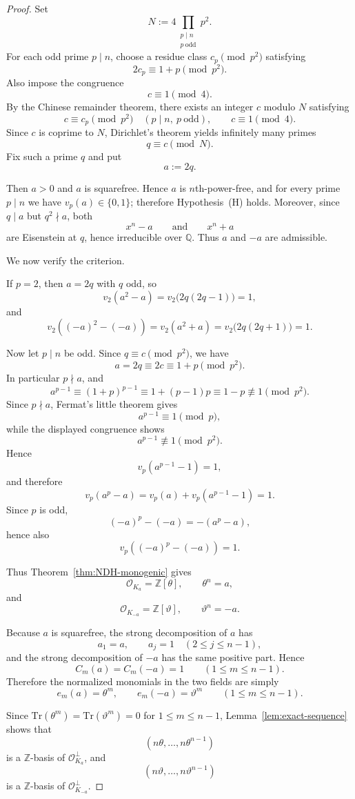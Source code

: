 \documentclass[10pt,a4paper]{amsart}
\newcommand{\Q}{\mathbb{Q}}
\newcommand{\Tr}{\mathrm{Tr}}
\newcommand{\Z}{\mathbb{Z}}
\newcommand{\cO}{\mathcal{O}}
\begin{document}
\begin{proof}
Set
\[
N:=4\prod_{\substack{p\mid n\\ p\ \mathrm{odd}}} p^2.
\]
For each odd prime \(p\mid n\), choose a residue class \(c_p\pmod{p^2}\) satisfying
\[
2c_p\equiv 1+p \pmod{p^2}.
\]
Also impose the congruence
\[
c\equiv 1 \pmod 4.
\]
By the Chinese remainder theorem, there exists an integer \(c\) modulo \(N\) satisfying
\[
c\equiv c_p \pmod{p^2}\quad (p\mid n,\ p\ \mathrm{odd}),
\qquad
c\equiv 1\pmod 4.
\]
Since \(c\) is coprime to \(N\), Dirichlet's theorem yields infinitely many primes
\[
q\equiv c \pmod N.
\]
Fix such a prime \(q\) and put
\[
a:=2q.
\]

Then \(a>0\) and \(a\) is squarefree. Hence \(a\) is \(n\)th-power-free, and for every prime
\(p\mid n\) we have \(v_p(a)\in\{0,1\}\); therefore Hypothesis~\textup{(H)} holds.
Moreover, since \(q\mid a\) but \(q^2\nmid a\), both
\[
x^n-a\qquad\text{and}\qquad x^n+a
\]
are Eisenstein at \(q\), hence irreducible over \(\Q\). Thus \(a\) and \(-a\) are admissible.

We now verify the criterion.

If \(p=2\), then \(a=2q\) with \(q\) odd, so
\[
v_2(a^2-a)=v_2\bigl(2q(2q-1)\bigr)=1,
\]
and
\[
v_2((-a)^2-(-a))=v_2(a^2+a)=v_2\bigl(2q(2q+1)\bigr)=1.
\]

Now let \(p\mid n\) be odd. Since \(q\equiv c\pmod{p^2}\), we have
\[
a=2q\equiv 2c\equiv 1+p \pmod{p^2}.
\]
In particular \(p\nmid a\), and
\[
a^{p-1}\equiv (1+p)^{p-1}\equiv 1+(p-1)p \equiv 1-p \not\equiv 1 \pmod{p^2}.
\]
Since \(p\nmid a\), Fermat's little theorem gives
\[
a^{p-1}\equiv 1 \pmod p,
\]
while the displayed congruence shows
\[
a^{p-1}\not\equiv 1 \pmod{p^2}.
\]
Hence
\[
v_p(a^{p-1}-1)=1,
\]
and therefore
\[
v_p(a^p-a)=v_p(a)+v_p(a^{p-1}-1)=1.
\]
Since \(p\) is odd,
\[
(-a)^p-(-a)=-(a^p-a),
\]
hence also
\[
v_p((-a)^p-(-a))=1.
\]

Thus Theorem~\ref{thm:NDH-monogenic} gives
\[
\cO_{K_a}=\Z[\theta],\qquad \theta^n=a,
\]
and
\[
\cO_{K_{-a}}=\Z[\vartheta],\qquad \vartheta^n=-a.
\]

Because \(a\) is squarefree, the strong decomposition of \(a\) has
\[
a_1=a,\qquad a_j=1\quad (2\le j\le n-1),
\]
and the strong decomposition of \(-a\) has the same positive part. Hence
\[
C_m(a)=C_m(-a)=1
\qquad (1\le m\le n-1).
\]
Therefore the normalized monomials in the two fields are simply
\[
e_m(a)=\theta^m,
\qquad
e_m(-a)=\vartheta^m
\qquad (1\le m\le n-1).
\]

Since \(\Tr(\theta^m)=\Tr(\vartheta^m)=0\) for \(1\le m\le n-1\), Lemma~\ref{lem:exact-sequence}
shows that
\[
(n\theta,\dots,n\theta^{n-1})
\]
is a \(\Z\)-basis of \(\cO_{K_a}^{\perp}\), and
\[
(n\vartheta,\dots,n\vartheta^{n-1})
\]
is a \(\Z\)-basis of \(\cO_{K_{-a}}^{\perp}\).


\end{proof}
\end{document}
